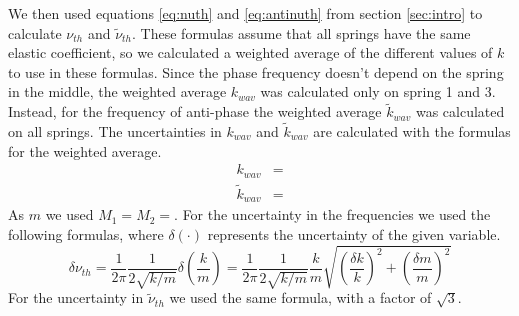 \documentclass{article}
\begin{document}
We then used equations \ref{eq:nuth} and \ref{eq:antinuth} from section \ref{sec:intro} to calculate $\nu_{th}$
and $\tilde \nu_{th}$. These formulas assume that all springs have
the same elastic coefficient, so we calculated a weighted average of
the different values of $k$ to use in these formulas. Since the phase
frequency doesn't depend on the spring in the middle, the
weighted average $k_{wav}$ was calculated only on spring 1 and 3.
Instead, for the frequency of anti-phase the weighted average 
$\tilde k_{wav}$ was calculated on all springs. The uncertainties in $k_{wav}$ and $\tilde k_{wav}$ are calculated with the formulas for the weighted average. 
\begin{align}
           k_{wav} &= \\
    \tilde k_{wav} &=
\end{align}
As $m$ we used $M_1=M_2=$.
For the uncertainty in the frequencies we used the following formulas, where $\delta(\cdot)$ represents the uncertainty of the given variable.
\begin{equation} \label{eq:inc_nuth}
    \delta \nu_{th}
    = \frac{1}{2\pi} \frac{1}{2\sqrt{k/m}} \delta \left ( \frac{k}{m} \right )
    = \frac{1}{2\pi} \frac{1}{2\sqrt{k/m}}  \frac{k}{m} \sqrt{ \left ( \frac{ \delta k}{k}  \right ) ^2 +
           \left ( \frac{ \delta m}{m}  \right ) ^2}
\end{equation}
For the uncertainty in $\tilde \nu_{th}$ we used the same formula, with a factor of $\sqrt 3$.
\end{document}
